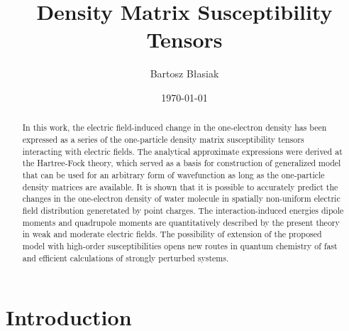 \documentclass[aip,amsmath,amssymb,reprint]{revtex4-1}
\begin{document}

\title{Density Matrix Susceptibility Tensors} %

\author{Bartosz B{\l}asiak}

\date{\today}

\begin{abstract}


In this work, the electric field\hyp{}induced change in the one\hyp{}electron density
has been expressed as a series of the one\hyp{}particle density matrix susceptibility tensors
interacting with electric fields. The analytical approximate expressions were derived
at the Hartree\hyp{}Fock theory, which served as a basis for construction of generalized
model that can be used for an arbitrary form of wavefunction as long as the one\hyp{}particle
density matrices are available. It is shown that it is possible to accurately predict the changes
in the one\hyp{}electron density of water molecule in spatially non\hyp{}uniform electric field distribution
generetated by point charges. The interaction\hyp{}induced energies
dipole moments and quadrupole moments
are quantitatively described by the present theory in weak and moderate electric fields.
The possibility of extension of the proposed model with high\hyp{}order susceptibilities
opens new routes in quantum chemistry of fast and efficient calculations of strongly perturbed systems.
\end{abstract}

\pacs{}%

\maketitle %

\section{\label{s:1}Introduction}
\end{document}
